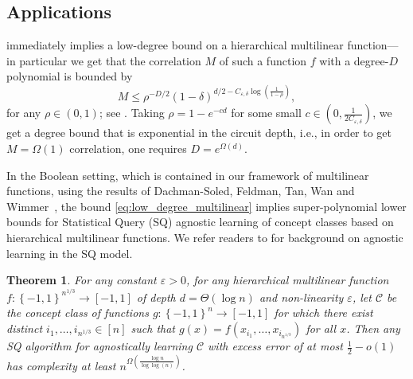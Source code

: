 \documentclass[12pt,letterpaper]{amsart}
\newcommand{\mc}[1]{\mathcal{#1}}
\newcommand{\set}[1]{\left\{#1\right\}}
\newcommand{\paren}[1]{\left(#1\right)}
\newcommand{\1}[1]{1_{\left\{#1\right\}}}
\newtheorem{theorem}{Theorem}[section]
\theoremstyle{definition}
\theoremstyle{remark}
\begin{document}
\subsection{Applications}
 immediately implies a low-degree bound on a hierarchical multilinear function---in particular we get that the correlation $M$ of such a function $f$ with a degree-$D$ polynomial is bounded by
\begin{equation}\label{eq:low_degree_multilinear}
    M \leq \rho^{-D/2}(1-\delta)^{d/2-C_{\varepsilon,\delta}\log\paren{\frac{1}{1-\rho}}},
\end{equation}
for any $\rho\in(0,1)$; see .
Taking $\rho=1-e^{-cd}$ for some small $c\in\paren{0,\frac{1}{2C_{\varepsilon,\delta}}}$, we get a degree bound that is exponential in the circuit depth, i.e., in order to get $M=\Omega(1)$ correlation, one requires $D=e^{\Omega(d)}$.

In the Boolean setting, which is contained in our framework of multilinear functions, using the results of Dachman-Soled, Feldman, Tan, Wan and Wimmer~\cite{dachman2014approximate}, the bound \eqref{eq:low_degree_multilinear} implies super-polynomial lower bounds for Statistical Query (SQ) agnostic learning of concept classes based on hierarchical multilinear functions.
We refer readers to \cite{dachman2014approximate} for background on agnostic learning in the SQ model.
\begin{theorem}\label{theorem:sq_learning_Boolean}
    For any constant $\varepsilon>0$, for any hierarchical multilinear function $f:\set{-1,1}^{n^{1/3}}\to[-1,1]$ of depth $d=\Theta(\log n)$ and non-linearity $\varepsilon$, let $\mc C$ be the concept class of functions $g:\set{-1,1}^n\to[-1,1]$ for which there exist distinct $i_1,\dots,i_{n^{1/3}}\in[n]$ such that $g(x)=f(x_{i_1},\dots,x_{i_{n^{1/3}}})$ for all $x$.
    Then any SQ algorithm for agnostically learning $\mc C$ with excess error of at most $\frac{1}{2}-o(1)$ has complexity at least $n^{\Omega\paren{\frac{\log n}{\log\log(n)}}}$.
\end{theorem}
\end{document}
